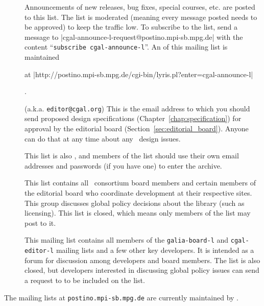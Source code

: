 \begin{description}
\item[] 
     Announcements of new releases, bug fixes, special courses, etc. are posted
     to this list.  The list is moderated (meaning every message posted needs
     to be approved) to keep the traffic low.
     To subscribe to the list, send a message to
     {\nonlinkedpath|cgal-announce-l-request@postino.mpi-sb.mpg.de|}
     with the content ``\texttt{subscribe cgal-announce-l}''.
     An  
     of this mailing list is maintained%
     \begin{ccTexOnly}
     at \nonlinkedpath|http://postino.mpi-sb.mpg.de/cgi-bin/lyris.pl?enter=cgal-announce-l|
     \end{ccTexOnly}.

\item[] 
     (a.k.a. \texttt{editor@cgal.org})
     This is the email address to which you should
     send proposed design specifications (Chapter~\ref{chap:specification})
     for approval by the editorial 
     board (Section~\ref{sec:editorial_board}). Anyone can do that 
     at any time about any \cgal\ design issues. 

     This list is also
     , and members of the list should use their own
     email addresses and passwords (if you have one) to enter the archive.

\item[] 
     This list contains all \galia\ consortium board members and certain 
     members of the editorial board who coordinate development at their 
     respective sites.
     This group discusses global policy decisions about the library (such
     as licensing).  This list is closed, which means only members of the list 
     may post to it.

\item[] 
     This mailing list contains all members of the \texttt{galia-board-l} and
     \texttt{cgal-editor-l} mailing lists and a few other key developers.
     It is intended as a forum for discussion among developers and board 
     members.  The list is also closed, but developers interested in 
     discussing global policy issues can send a request to 
      to be included
     on the list.
\end{description}

The mailing lists at \texttt{postino.mpi-sb.mpg.de} 
are currently
maintained by . 
